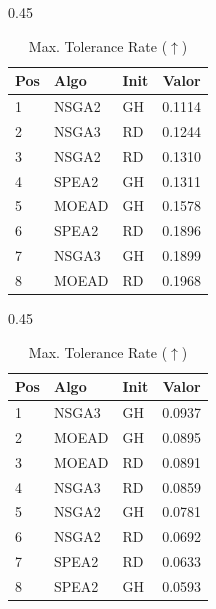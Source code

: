 \documentclass[a4paper,10pt]{article} %
\begin{document}
\begin{table}[H]
    \centering
    \begin{subtable}[t]{0.45\textwidth}
        \centering
        \caption{MinSum ($\downarrow$)}
        \begin{tabular}{lllc}
            \toprule
            Pos & Algo & Init & Valor \\
            \midrule
            1 & NSGA2 & GH & 0.1114 \\
            2 & NSGA3 & RD & 0.1244 \\
            3 & NSGA2 & RD & 0.1310 \\
            4 & SPEA2 & GH & 0.1311 \\
            5 & MOEAD & GH & 0.1578 \\
            6 & SPEA2 & RD & 0.1896 \\
            7 & NSGA3 & GH & 0.1899 \\
            8 & MOEAD & RD & 0.1968 \\
            \bottomrule
        \end{tabular}
    \end{subtable}
    \hfill
    \begin{subtable}[t]{0.45\textwidth}
        \centering
        \caption{Max. Tolerance Rate ($\uparrow$)}
        \begin{tabular}{lllc}
            \toprule
            Pos & Algo & Init & Valor \\
            \midrule
            1 & NSGA3 & GH & 0.0937 \\
            2 & MOEAD & GH & 0.0895 \\
            3 & MOEAD & RD & 0.0891 \\
            4 & NSGA3 & RD & 0.0859 \\
            5 & NSGA2 & GH & 0.0781 \\
            6 & NSGA2 & RD & 0.0692 \\
            7 & SPEA2 & RD & 0.0633 \\
            8 & SPEA2 & GH & 0.0593 \\
            \bottomrule
        \end{tabular}
    \end{subtable}
\end{table}
\end{document}
